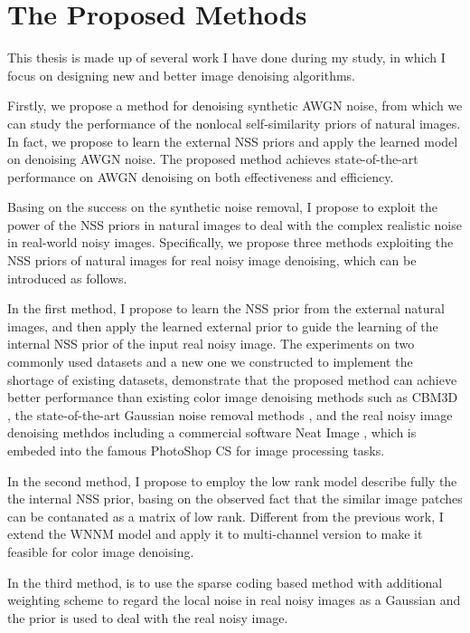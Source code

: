 \section{The Proposed Methods}
\label{sec:intro:new}

This thesis is made up of several work I have done during my study, in which I focus on designing new and better image denoising algorithms. 

Firstly, we propose a method for denoising synthetic AWGN noise, from which we can study the performance of the nonlocal self-similarity priors of natural images. In fact, we propose to learn the external NSS priors and apply the learned model on denoising AWGN noise. The proposed method achieves state-of-the-art performance on AWGN denoising on both effectiveness and efficiency. 

Basing on the success on the synthetic noise removal, I propose to exploit the power of the NSS priors in natural images to deal with the complex realistic noise in real-world noisy images. Specifically, we propose three methods exploiting the NSS priors of natural images for real noisy image denoising, which can be introduced as follows.

In the first method, I propose to learn the NSS prior from the external natural images, and then apply the learned external prior to guide the learning of the internal NSS prior of the input real noisy image. The experiments on two commonly used datasets and a new one we constructed to implement the shortage of existing datasets, demonstrate that the proposed method can achieve better performance than existing color image denoising methods such as CBM3D \cite{cbm3d}, the state-of-the-art Gaussian noise removal methods \cite{bm3d,mlp,csr}, and the real noisy image denoising methdos \cite{} including a commercial software Neat Image \cite{neatimage}, which is embeded into the famous PhotoShop CS for image processing tasks.


In the second method, I propose to employ the low rank model describe fully the the internal NSS prior, basing on the observed fact that the similar image patches can be contanated as a matrix of low rank. Different from the previous work, I extend the WNNM model and apply it to multi-channel version to make it feasible for color image denoising. 

In the third method,  is to use the sparse coding based method with additional weighting scheme to regard the local noise in real noisy images as a Gaussian and the prior is used to deal with the real noisy image.

